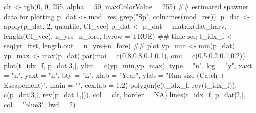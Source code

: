 \documentclass[11pt,]{article}
\newenvironment{Shaded}{}{}
\newcommand{\KeywordTok}[1]{\textcolor[rgb]{0.00,0.00,1.00}{#1}}
\newcommand{\DataTypeTok}[1]{#1}
\newcommand{\DecValTok}[1]{#1}
\newcommand{\FloatTok}[1]{#1}
\newcommand{\StringTok}[1]{\textcolor[rgb]{0.00,0.50,0.50}{#1}}
\newcommand{\OtherTok}[1]{\textcolor[rgb]{1.00,0.25,0.00}{#1}}
\newcommand{\OperatorTok}[1]{#1}
\newcommand{\NormalTok}[1]{#1}
\begin{document}
\begin{Shaded}
\begin{Highlighting}[]
\NormalTok{clr <-}\StringTok{ }\KeywordTok{rgb}\NormalTok{(}\DecValTok{0}\NormalTok{, }\DecValTok{0}\NormalTok{, }\DecValTok{255}\NormalTok{, }\DataTypeTok{alpha =} \DecValTok{50}\NormalTok{, }\DataTypeTok{maxColorValue =} \DecValTok{255}\NormalTok{)}
\NormalTok{## estimated spawner data for plotting}
\NormalTok{p_dat <-}\StringTok{ }\NormalTok{mod_res[,}\KeywordTok{grep}\NormalTok{(}\StringTok{"Sp"}\NormalTok{, }\KeywordTok{colnames}\NormalTok{(mod_res))]}
\NormalTok{p_dat <-}\StringTok{ }\KeywordTok{apply}\NormalTok{(p_dat, }\DecValTok{2}\NormalTok{, quantile, CI_vec)}
\NormalTok{p_dat <-}\StringTok{ }\NormalTok{p_dat }\OperatorTok{+}\StringTok{ }\KeywordTok{matrix}\NormalTok{(dat_harv, }\KeywordTok{length}\NormalTok{(CI_vec), n_yrs}\OperatorTok{+}\NormalTok{n_fore, }\DataTypeTok{byrow =} \OtherTok{TRUE}\NormalTok{)}
\NormalTok{## time seq}
\NormalTok{t_idx_f <-}\StringTok{ }\KeywordTok{seq}\NormalTok{(yr_frst, }\DataTypeTok{length.out =}\NormalTok{ n_yrs}\OperatorTok{+}\NormalTok{n_fore)}
\NormalTok{## plot}
\NormalTok{yp_min <-}\StringTok{ }\KeywordTok{min}\NormalTok{(p_dat)}
\NormalTok{yp_max <-}\StringTok{ }\KeywordTok{max}\NormalTok{(p_dat)}
\KeywordTok{par}\NormalTok{(}\DataTypeTok{mai =} \KeywordTok{c}\NormalTok{(}\FloatTok{0.8}\NormalTok{,}\FloatTok{0.8}\NormalTok{,}\FloatTok{0.1}\NormalTok{,}\FloatTok{0.1}\NormalTok{), }\DataTypeTok{omi =} \KeywordTok{c}\NormalTok{(}\FloatTok{0.5}\NormalTok{,}\FloatTok{0.2}\NormalTok{,}\FloatTok{0.1}\NormalTok{,}\FloatTok{0.2}\NormalTok{))}
\KeywordTok{plot}\NormalTok{(t_idx_f, p_dat[}\DecValTok{3}\NormalTok{,], }\DataTypeTok{ylim =} \KeywordTok{c}\NormalTok{(yp_min,yp_max), }\DataTypeTok{type =} \StringTok{"n"}\NormalTok{,}
     \DataTypeTok{log =} \StringTok{"y"}\NormalTok{, }\DataTypeTok{xaxt =} \StringTok{"n"}\NormalTok{, }\DataTypeTok{yaxt =} \StringTok{"n"}\NormalTok{, }\DataTypeTok{bty =} \StringTok{"L"}\NormalTok{,}
     \DataTypeTok{xlab =} \StringTok{"Year"}\NormalTok{, }\DataTypeTok{ylab =} \StringTok{"Run size (Catch + Escapement)"}\NormalTok{, }\DataTypeTok{main =} \StringTok{""}\NormalTok{, }\DataTypeTok{cex.lab =} \FloatTok{1.2}\NormalTok{)}
\KeywordTok{polygon}\NormalTok{(}\KeywordTok{c}\NormalTok{(t_idx_f, }\KeywordTok{rev}\NormalTok{(t_idx_f)), }\KeywordTok{c}\NormalTok{(p_dat[}\DecValTok{3}\NormalTok{,], }\KeywordTok{rev}\NormalTok{(p_dat[}\DecValTok{1}\NormalTok{,])),}
        \DataTypeTok{col =}\NormalTok{ clr, }\DataTypeTok{border =} \OtherTok{NA}\NormalTok{)}
\KeywordTok{lines}\NormalTok{(t_idx_f, p_dat[}\DecValTok{2}\NormalTok{,], }\DataTypeTok{col =} \StringTok{"blue3"}\NormalTok{, }\DataTypeTok{lwd =} \DecValTok{2}\NormalTok{)}

\end{Highlighting}
\end{Shaded}
\end{document}
